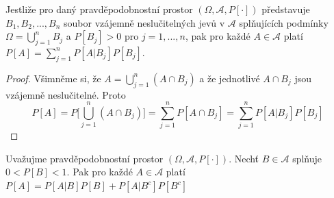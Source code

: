 \begin{theorem}
Jestliže pro daný pravděpodobnostní prostor $(\Omega, \mathscr{A}, P[\cdot])$ představuje $B_1, B_2, ..., B_n$ soubor vzájemně neslučitelných jevů v $\mathscr{A}$ splňujících podmínky $\Omega = \bigcup_{j=1}^n B_j$ a $P[B_j] > 0$ pro $j = 1, ..., n$, pak pro každé $A \in \mathscr{A}$ platí $P[A] = \sum_{j=1}^nP[A|B_j]P[B_j]$.
\end{theorem}
\begin{proof}
Všimněme si, že $A = \bigcup_{j=1}^n (A \cap B_j)$ a že jednotlivé $A \cap B_j$ jsou vzájemně neslučitelné. Proto
\begin{equation*}
P[A] = P\Big[\bigcup_{j=1}^n (A \cap B_j)\Big] = \sum_{j=1}^nP[A \cap B_j] = \sum_{j=1}^n P[A|B_j]P[B_j]
\end{equation*}
\end{proof}
\begin{corollary}
Uvažujme pravděpodobnostní prostor $(\Omega, \mathscr{A}, P[\cdot])$. Nechť $B \in \mathscr{A}$ splňuje $0 < P[B] < 1$. Pak pro každé $A \in \mathscr{A}$ platí $P[A] = P[A|B]P[B]+P[A|B^c]P[B^c]$
\end{corollary}

